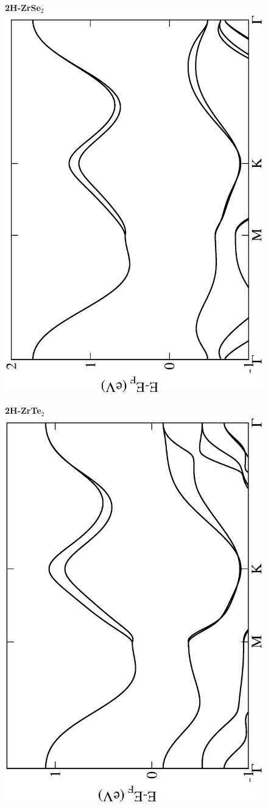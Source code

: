 \begin{figure}[htbp]
\centering
{\bfseries \sffamily 2H-ZrSe$_{2}$}\\
\includegraphics[width=0.45\linewidth, angle=-90, trim={2.9cm, 0cm, 2cm, 0cm}, clip]{img/SI_figs/BS/2H-ZrSe2.eps}
\end{figure}

\begin{figure}[htbp]
\centering
{\bfseries \sffamily 2H-ZrTe$_{2}$}\\
\includegraphics[width=0.45\linewidth, angle=-90, trim={2.9cm, 0cm, 2cm, 0cm}, clip]{img/SI_figs/BS/2H-ZrTe2.eps}
\end{figure}

